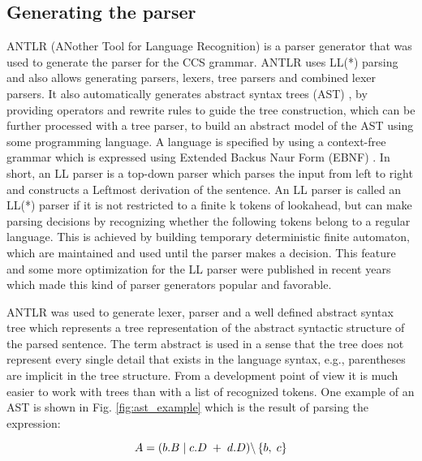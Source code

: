 \subsection{Generating the parser}
ANTLR (ANother Tool for Language Recognition) \cite{ANTLRRef} is a parser generator that was used 
to generate the parser for the CCS grammar. ANTLR uses LL(*) parsing and also allows generating 
parsers, lexers, tree parsers and combined lexer parsers. It also automatically generates 
abstract syntax trees (AST) \cite{Compilers}, by providing operators and rewrite rules to guide the tree construction,
which can be further processed with a tree parser, to build an abstract model of the AST using some programming language.
A language is specified by using a context-free grammar which is expressed using Extended Backus Naur Form (EBNF) \cite{Compilers}. 
In short, an LL parser is a 
top-down parser which parses the input from left to right and constructs a Leftmost derivation 
of the sentence. An LL parser is called an LL(*) parser if it is not restricted to a finite k 
tokens of lookahead, but can make parsing decisions by recognizing whether the following tokens
belong to a regular language. This is achieved by building temporary deterministic finite
automaton, which are maintained and used until the parser makes a decision. This feature and
some more optimization for the LL parser were published in recent years which made this kind 
of parser generators popular and favorable.

ANTLR was used to generate lexer, parser and a well defined abstract syntax tree which represents a tree representation 
of the abstract syntactic structure of the parsed sentence. The term abstract is used in a sense 
that the tree does not represent every single detail that exists in the language syntax, 
e.g., parentheses are implicit in the tree structure. From a development point of view it is 
much easier to work with trees than with a list of recognized tokens. One example of an AST 
is shown in  Fig. \ref{fig:ast_example} which is the result of parsing the expression: 

\begin{equation}\label{eq:ccs_example}
 A=( b.B \hspace{1 mm} | \hspace{1 mm} c.D \hspace{1 mm} + \hspace{1 mm} d.D )
\backslash \left\lbrace b, \hspace{1 mm} c \right\rbrace 
\end{equation}

